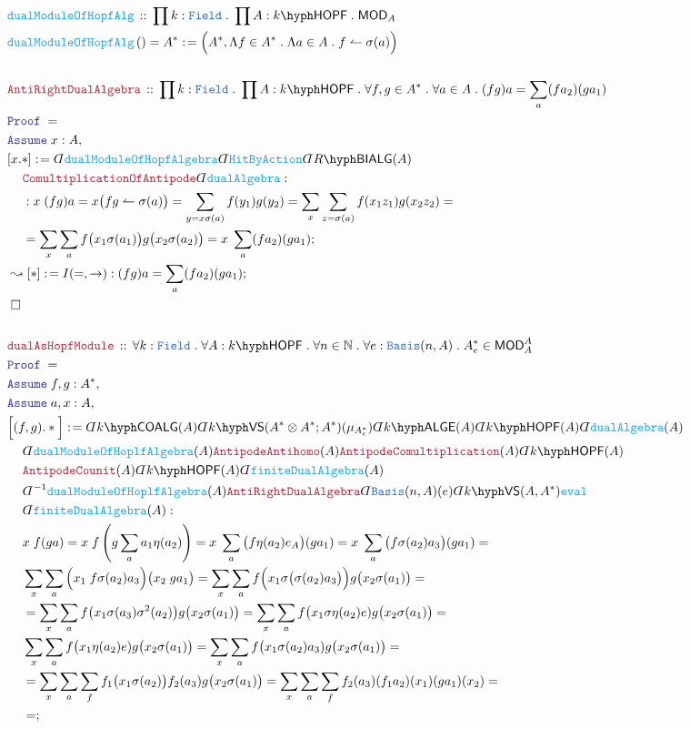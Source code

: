 \documentclass[12pt]{scrartcl}%
\newcommand{\TYPE}[1]{\textcolor{NavyBlue}{\mathtt{#1}}}%
\newcommand{\FUNC}[1]{\textcolor{Cerulean}{\mathtt{#1}}}%
\newcommand{\LOGIC}[1]{\textcolor{Blue}{\mathtt{#1}}}%
\newcommand{\THM}[1]{\textcolor{Maroon}{\mathtt{#1}}}%
\renewcommand{\.}{\; . \;} %
\newcommand{\de}{: \kern 0.1pc =} %
\newcommand{\Act}[1]{\left( #1 \right)} %
\newcommand{\Theorem}[2]{& \THM{#1} \, :: \, #2 \\ & \Proof = \\ } %
\newcommand{\DeclareFunc}[2]{& \FUNC{#1} \, :: \, #2 \\}%
\newcommand{\DefineNamedFunc}[4]{&  \FUNC{#1}\Act{#2} = #3 \de #4 \\}%
\newcommand{\NewLine}{\\ & \kern 1pc}%
\newcommand{\Page}[1]{ \begin{align*} #1 \end{align*}  }%
\newcommand{ \bd }{ \ByDef }%
\newcommand{\Nat}{\mathbb{N}}%
\newcommand{\Conclude}[3]{& #1 \de #2 : #3; \\}%
\newcommand{\DeriveConclude}[3]{& \leadsto #1 \de #2 : #3 ; \\} %
\newcommand{\Assume}[2]{& \LOGIC{Assume} \; #1 : #2, \\} %
\newcommand{\QED}{\; \square} %
\newcommand{\EndProof}{& \QED \\} %
\newcommand{\ByDef}{\rotatebox[origin=c]{-180}{$D$}}%
\newcommand{\Proof}{\LOGIC{Proof} \; } %
\newcommand{\Basis}{\TYPE{Basis}} %
\newcommand{\VS}[1]{#1\hyph\mathsf{VS}} %
\newcommand{\Field}{\TYPE{Field}}
\newcommand{\LALGE}[1]{#1\hyph\mathsf{ALGE}}%
\newcommand{\COALG}[1]{#1\hyph\mathsf{COALG}}%
\newcommand{\hitBy}{\leftharpoonup}
\newcommand{\RAMOD}[1]{\mathsf{MOD}_{#1}}%
\newcommand{\BIALG}[1]{#1\hyph\mathsf{BIALG}}%
\newcommand{\HOPF}[1]{#1\hyph\mathsf{HOPF}}%
\newcommand{\RHMOD}[1]{\mathsf{MOD}^{#1}_{#1}}%
\begin{document}
\Page{
	\DeclareFunc{dualModuleOfHopfAlg}{\prod k : \Field \. \prod A : \HOPF{k} \.  \RAMOD{A}}
	\DefineNamedFunc{dualModuleOfHopfAlg}{}{A^*}{\Big(A^*, \Lambda f \in A^* \. \Lambda a \in A \. f \hitBy \sigma(a) \Big)} 
	\\
	\Theorem{AntiRightDualAlgebra}{
		\prod k : \Field \. \prod A : \HOPF{k} \. 
		\forall f,g \in A^* \. \forall a \in A \.
		(fg)a = \sum_a (fa_2)(ga_1) 
	}
	\Assume{x}{A}
	\Conclude{[x.*]}{  
		\bd \FUNC{dualModuleOfHopfAlgebra}
		\bd \FUNC{HitByAction}
		\bd \BIALG{R}(A) \NewLine
		\THM{ComultiplicationOfAntipode} 
		\bd \FUNC{dualAlgebra}
	}
	{
		\NewLine :
		x \; (fg)a = 
		x\big(fg \hitBy \sigma(a)\big) = 
		\sum_{y = x\sigma(a)} f(y_1)g(y_2) = 
		\sum_{x} \sum_{z = \sigma(a)} f(x_1z_1)g(x_2z_2) = \NewLine =
		\sum_{x} \sum_{a}   f\big(x_1\sigma(a_1)\big) g\big(x_2\sigma(a_2)\big)
		=  x\;\sum_a (fa_2)(ga_1)
	}
	\DeriveConclude{[*]}{I(=,\to)}{(fg)a = \sum_a (fa_2)(ga_1)}
	\EndProof
	\\
	\Theorem{dualAsHopfModule}
	{
		\forall k : \Field \.
		\forall A : \HOPF{k} \.
		\forall n \in \Nat \.
		\forall e : \Basis(n,A) \.
		A^*_e \in \RHMOD{A}
	}
	\Assume{f,g}{A^*}
	\Assume{a,x}{A}
	\Conclude{\Big[(f,g).*\Big]}{ 
		\bd  \COALG{k}(A)
		\bd \VS{k}(A^* \otimes A^*; A^*)(\mu_{A^*_e}) \bd \LALGE{k}(A)
		\bd \HOPF{k}(A)
		\bd \FUNC{dualAlgebra}(A) \NewLine 
		\bd \FUNC{dualModuleOfHoplfAlgebra}(A) 
		\THM{AntipodeAntihomo}(A)
		\THM{AntipodeComultiplication}(A)
		\bd \HOPF{k}(A) \NewLine
		\THM{AntipodeCounit}(A)
		\bd \HOPF{k}(A)
		\bd \FUNC{finiteDualAlgebra}(A)
		\NewLine
		\bd^{-1} \FUNC{dualModuleOfHoplfAlgebra}(A)
		\THM{AntiRightDualAlgebra}
		\bd \Basis(n,A)(e)
		\bd \VS{k}(A,A^*)\FUNC{eval} \NewLine
		\bd \FUNC{finiteDualAlgebra}(A)
	}
	{
		\NewLine
		x \; f(g a)  = 
		x \; f\left( g \sum_a  a_1 \eta(a_2) \right) =
		x \; \sum_a \big( f\eta(a_2)e_A \big) (ga_1) =
		x \; \sum_a \big(f \sigma(a_2) a_3 \big) (ga_1)= \NewLine
		\sum_x \sum_a  \Big( x_1 \; f \sigma(a_2) a_3 \Big) \big( x_2 \; ga_1\big)=
		\sum_x \sum_a  f \Big( x_1 \sigma\big( \sigma(a_2) a_3\big)\Big) g\big( x_2 \sigma(a_1) \big) = 
		 \NewLine = 
		\sum_x \sum_a  f \big( x_1 \sigma(a_3)\sigma^2(a_2) \big) g\big( x_2 \sigma(a_1) \big) = 
		\sum_x \sum_a  f \big( x_1 \sigma\eta(a_2) e) g\big( x_2 \sigma(a_1) \big) = \NewLine
		\sum_x \sum_a  f \big( x_1 \eta(a_2) e) g\big( x_2 \sigma(a_1) \big) =  
		\sum_x \sum_a  f \big( x_1 \sigma(a_2)a_3) g\big( x_2 \sigma(a_1) \big) = \NewLine =
		\sum_x \sum_a \sum_f  f_1\big(x_1 \sigma(a_2)\big)f_2(a_3)g\big( x_2 \sigma(a_1)  \big) = 
		\sum_x \sum_a \sum_f  f_2(a_3)  (f_1 a_2)(x_1) (g a_1)(x_2) = \NewLine = 
}}
\end{document}
